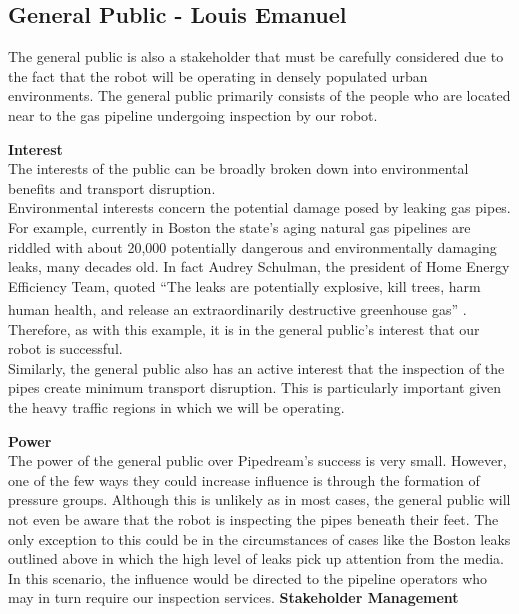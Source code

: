 \documentclass[11pt]{article}		%
\newcommand{\supercite}[1]{\textsuperscript{\cite{#1}}}		%
\begin{document}
		\subsection[General Public]{General Public - Louis Emanuel}
			The general public is also a stakeholder that must be carefully considered due to the fact that the robot will be operating in densely populated urban environments. The general public primarily consists of the people who are located near to the gas pipeline undergoing inspection by our robot.
			
			\textbf{Interest}\\
	        The interests of the public can be broadly broken down into environmental benefits and transport disruption.\\
		    \hspace*{3ex}Environmental interests concern the potential damage posed by leaking gas pipes. For example, currently in Boston the state’s aging natural gas pipelines are riddled with about 20,000 potentially dangerous and environmentally damaging leaks, many decades old. In fact Audrey Schulman, the president of Home Energy Efficiency Team, quoted  “The leaks are potentially explosive, kill trees, harm human health, and release an extraordinarily destructive greenhouse gas” \supercite{leaks}. Therefore, as with this example, it is in the general public's interest that our robot is successful. \\
	        \hspace*{3ex}Similarly, the general public also has an active interest that the inspection of the pipes create minimum transport disruption. This is particularly important given the heavy traffic regions in which we will be operating. 
	        
	        \textbf{Power}\\
	        The power of the general public over Pipedream's success is very small. However, one of the few ways they could increase influence is through the formation of pressure groups. Although this is unlikely as in most cases, the general public will not even be aware that the robot is inspecting the pipes beneath their feet. The only exception to this could be in the circumstances of cases like the Boston leaks outlined above in which the high level of leaks pick up attention from the media. In this scenario, the influence would be directed to the pipeline operators who may in turn require our inspection services.
	        \textbf{Stakeholder Management}\\
	        
\end{document}

